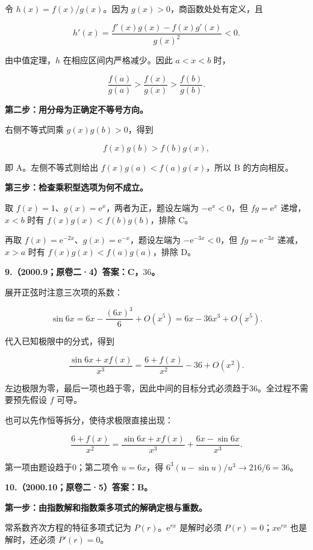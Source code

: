 \documentclass[UTF8,11pt,fontset=windows]{ctexart}
\begin{document}
令 $h(x)=f(x)/g(x)$。因为 $g(x)>0$，商函数处处有定义，且

$$
h'(x)=\frac{f'(x)g(x)-f(x)g'(x)}{g(x)^2}<0.
$$

由中值定理，$h$ 在相应区间内严格减少。因此 $a<x<b$ 时，

$$
\frac{f(a)}{g(a)}>\frac{f(x)}{g(x)}>\frac{f(b)}{g(b)}.
$$

\textbf{第二步：用分母为正确定不等号方向。}

右侧不等式同乘 $g(x)g(b)>0$，得到

$$
f(x)g(b)>f(b)g(x),
$$

即 A。左侧不等式则给出 $f(x)g(a)<f(a)g(x)$，所以 B 的方向相反。

\textbf{第三步：检查乘积型选项为何不成立。}

取 $f(x)=1$、$g(x)=\mathrm e^x$，两者为正，题设左端为 $-\mathrm e^x<0$，但 $fg=\mathrm e^x$ 递增，$x<b$ 时有 $f(x)g(x)<f(b)g(b)$，排除 C。

再取 $f(x)=\mathrm e^{-2x}$、$g(x)=\mathrm e^{-x}$，题设左端为 $-\mathrm e^{-3x}<0$，但 $fg=\mathrm e^{-3x}$ 递减，$x>a$ 时有 $f(x)g(x)<f(a)g(a)$，排除 D。

\clearpage

\textbf{9.（2000.9；原卷二·4）答案：C，$36$。}

展开正弦时注意三次项的系数：

$$
\sin6x=6x-\frac{(6x)^3}{6}+O(x^5)
=6x-36x^3+O(x^5).
$$

代入已知极限中的分式，得到

$$
\frac{\sin6x+xf(x)}{x^3}
=\frac{6+f(x)}{x^2}-36+O(x^2).
$$

左边极限为零，最后一项也趋于零，因此中间的目标分式必须趋于36。全过程不需要预先假设 $f$ 可导。

也可以先作恒等拆分，使待求极限直接出现：

$$
\frac{6+f(x)}{x^2}
=\frac{\sin6x+xf(x)}{x^3}
 +\frac{6x-\sin6x}{x^3}.
$$

第一项由题设趋于0；第二项令 $u=6x$，得 $6^3(u-\sin u)/u^3\to216/6=36$。

\clearpage

\textbf{10.（2000.10；原卷二·5）答案：B。}

\textbf{第一步：由指数解和指数乘多项式的解确定根与重数。}

常系数齐次方程的特征多项式记为 $P(r)$。$\mathrm e^{rx}$ 是解时必须 $P(r)=0$；$x\mathrm e^{rx}$ 也是解时，还必须 $P'(r)=0$。
\end{document}
